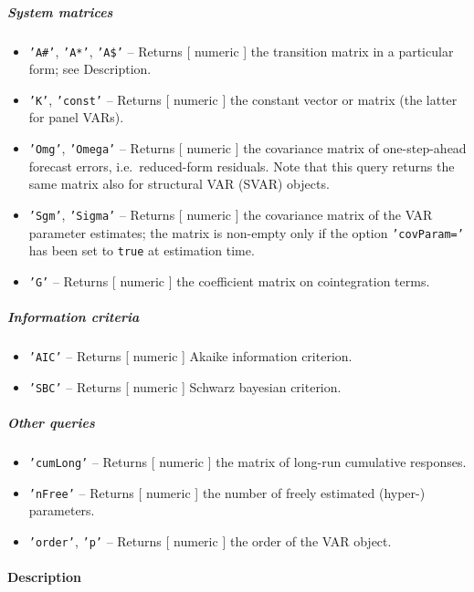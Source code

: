 \subparagraph{System matrices}

\begin{itemize}
\item
  \texttt{'A\#'}, \texttt{'A*'}, \texttt{'A\$'} -- Returns {[} numeric
  {]} the transition matrix in a particular form; see Description.
\item
  \texttt{'K'}, \texttt{'const'} -- Returns {[} numeric {]} the constant
  vector or matrix (the latter for panel VARs).
\item
  \texttt{'Omg'}, \texttt{'Omega'} -- Returns {[} numeric {]} the
  covariance matrix of one-step-ahead forecast errors, i.e.~reduced-form
  residuals. Note that this query returns the same matrix also for
  structural VAR (SVAR) objects.
\item
  \texttt{'Sgm'}, \texttt{'Sigma'} -- Returns {[} numeric {]} the
  covariance matrix of the VAR parameter estimates; the matrix is
  non-empty only if the option \texttt{'covParam='} has been set to
  \texttt{true} at estimation time.
\item
  \texttt{'G'} -- Returns {[} numeric {]} the coefficient matrix on
  cointegration terms.
\end{itemize}

\subparagraph{Information criteria}

\begin{itemize}
\item
  \texttt{'AIC'} -- Returns {[} numeric {]} Akaike information
  criterion.
\item
  \texttt{'SBC'} -- Returns {[} numeric {]} Schwarz bayesian criterion.
\end{itemize}

\subparagraph{Other queries}

\begin{itemize}
\item
  \texttt{'cumLong'} -- Returns {[} numeric {]} the matrix of long-run
  cumulative responses.
\item
  \texttt{'nFree'} -- Returns {[} numeric {]} the number of freely
  estimated (hyper-) parameters.
\item
  \texttt{'order'}, \texttt{'p'} -- Returns {[} numeric {]} the order of
  the VAR object.
\end{itemize}

\paragraph{Description}

